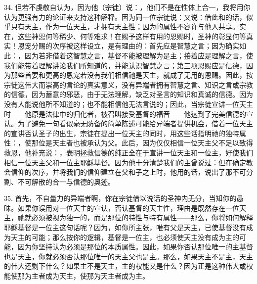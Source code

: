 34. 但若不虔敬自认为，因为他（宗徒）说：，他们不是在性体上合一，我将用你认为更强有力的论证来支持这种解释。因为同一位宗徒说：又说：借此和的话，似乎只有天主，作为一位天主，才拥有天主性；因为的属性不容许与他人共享。实在，这些神恩何等稀少、何等难求！在赐予这样有用的恩赐时，圣神的彰显何等真实！恩宠分赐的次序被这样设立，是有理由的：首先应是智慧之言；因为确实如此：，因为若非借着这智慧之言，基督不能被理解为是主；接着应是理解之言，使我们能带着理解讲论我们所知道的，并能认识智慧之言；第三项恩赐应是信德，因为那些首要和更高的恩宠若没有我们相信祂是天主，就成了无用的恩赐。因此，按宗徒这伟大而崇高的言论的真实意义，没有异端者拥有智慧之言、知识之言或宗教的信德，因为蓄意的邪恶，由于无法理解，缺乏对圣言的知识和真诚的信德。因为没有人能说他所不知道的；也不能相信他无法言说的；因此，当宗徒宣讲一位天主时——他原是法律中的归化者，被召叫接受基督的福音——他达到了完美信德的宣认。为了避免一句看似毫无防备的简单陈述可能给异端者提供机会，借着一位天主的宣讲否认圣子的出生，宗徒在提出一位天主的同时，用这些话指明祂的独特属性：，使那位是天主者也被承认为父。此后，因为仅仅相信一位天主父不足以致得救恩，他补充说：，表明拯救信德的纯正全在于宣讲一位天主和一位主，好使我们相信一位天主父和一位主耶稣基督。因为他十分清楚我们的主曾说过：但在确定教会信仰的次序，并将我们的信仰建立在父和子之上时，他用的话，说出了那不可分割、不可解散的合一与信德的奥迹。\par

35. 首先，不自量力的异端者啊，你在宗徒借以说话的圣神内无分，当知你的愚昧。如果你误用对一位天主的宣认，否认基督的天主性，理由是既然存在一位天主，祂就必须被视为独一的，而是那位的特性与特有属性——那么，你将如何解释耶稣基督是一位主这句话呢？因为，如你所主张，唯有父是天主，已使基督没有成为天主的可能；那么按你的逻辑，基督是一位主，也必须使天主没有成为主的可能，因为你坚持认为必须是那位的本质属性。因此，如果你否认那位唯一的主基督也是天主，你就必须否认那位唯一的天主父也是主。那么，如果天主不是主，天主的伟大还剩下什么？如果主不是天主，主的权能又是什么？因为正是这种伟大或权能使那为主者成为天主，使那为天主者成为主。\par

